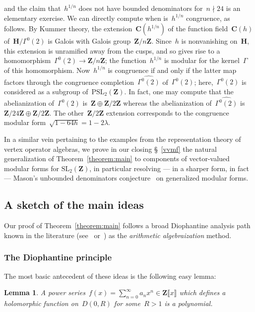\documentclass[10pt]{amsart}
\def\PSL{\mathrm{PSL}}
\def\SSSS{\S}
\def\Z{\mathbf{Z}}
\newtheorem{lemma}[subsubsection]{Lemma}
\theoremstyle{remark}
\numberwithin{equation}{subsection}
\def\C{\mathbf{C}}
\def\SL{\mathrm{SL}}
\def\H{\mathbf{H}}
\begin{document}
 and the claim that~$h^{1/n}$ does not have bounded denominators for~$n \nmid 24$ is an elementary exercise. 
  We can directly compute when is~$h^{1/n}$ congruence, as follows. 
 By Kummer theory, the extension~$\C(h^{1/n})$ of the function field~$\C(h)$ of~$\H/\Gamma^0(2)$ is Galois with Galois group~$\Z/n\Z$.
 Since~$h$ is nonvanishing
 on~$\H$, this extension is unramified away from the cusps, and so gives rise to a homomorphism~$\Gamma^0(2) \rightarrow \Z/n\Z$;
 the function~$h^{1/n}$ is modular for the kernel~$\Gamma$ of this homomorphism. Now~$h^{1/n}$
 is congruence if and only if the latter map factors through the congruence completion~$\widehat{\Gamma^0(2)}$ of~$\Gamma^0(2)$; here,~$\Gamma^0(2)$  is considered
 as a subgroup of~$\PSL_2(\Z)$.
 In fact, one may   compute that the abelianization of~$\Gamma^0(2)$ is~$\Z \oplus \Z/2\Z$
 whereas the abelianization of~$\widehat{\Gamma^0(2)}$ is~$\Z/24 \Z \oplus \Z/2\Z$. The other~$\Z/2\Z$ extension corresponds to the congruence modular form~$\sqrt{1-64 h} = 1 - 2 \lambda$.
 
In a similar vein pertaining to the examples from the representation theory of vertex operator algebras, we prove in our closing \SSSS~\ref{vvmf} the natural generalization of 
Theorem~\ref{theorem:main} to components of vector-valued modular forms for $\SL_2(\Z)$, in particular resolving --- in a sharper form, in fact --- Mason's unbounded denominators conjecture~\cite{MasonConjectured, KohnenMason} on generalized modular forms. 






\subsection{A sketch of the main ideas} \label{intro sketch}  Our proof of Theorem~\ref{theorem:main} follows a broad Diophantine analysis path known in the literature 
(see~\cite{BostGerms, BostAlg} or~\cite[Chapter~10]{BostBook}) as the \emph{arithmetic algebraization} method. 
\subsubsection{The Diophantine principle}
The most basic antecedent of these ideas is the following easy lemma:

\begin{lemma} \label{easylemma}
A power series~$f(x) = \sum_{n=0}^\infty a_n x^n \in \Z\llbracket x \rrbracket$ which  defines a holomorphic function on~$D(0,R)$ for some~$R > 1$ is a polynomial.
\end{lemma}
\end{document}

